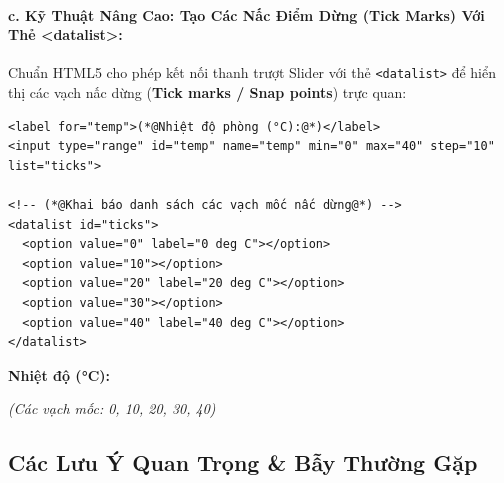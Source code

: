 \documentclass[11pt,oneside]{book}
\newcommand{\codeinline}[1]{\textcolor{accentOrange}{\texttt{#1}}}
\newcommand{\term}[1]{\textbf{\textcolor{primaryBlue}{#1}}}
\begin{document}
\paragraph{c. Kỹ Thuật Nâng Cao: Tạo Các Nấc Điểm Dừng (Tick Marks) Với Thẻ <datalist>:}
Chuẩn HTML5 cho phép kết nối thanh trượt Slider với thẻ \codeinline{<datalist>} để hiển thị các vạch nấc dừng (\term{Tick marks / Snap points}) trực quan:

\begin{codeWindow}
\begin{lstlisting}[language=HTML5]
<label for="temp">(*@Nhiệt độ phòng (°C):@*)</label>
<input type="range" id="temp" name="temp" min="0" max="40" step="10" list="ticks">

<!-- (*@Khai báo danh sách các vạch mốc nấc dừng@*) -->
<datalist id="ticks">
  <option value="0" label="0 deg C"></option>
  <option value="10"></option>
  <option value="20" label="20 deg C"></option>
  <option value="30"></option>
  <option value="40" label="40 deg C"></option>
</datalist>
\end{lstlisting}
\end{codeWindow}

\begin{browserWindow}
\sffamily\small
\textbf{Nhiệt độ (°C):} \quad
{} \quad \textcolor{codeComment}{\small\textit{(Các vạch mốc: 0, 10, 20, 30, 40)}}
\end{browserWindow}

\subsection{Các Lưu Ý Quan Trọng \& Bẫy Thường Gặp}
\end{document}
